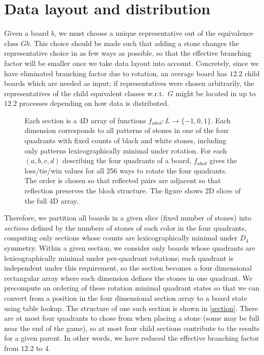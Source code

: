 \documentclass[conference]{IEEEtran}
\newcommand{\wrt}{w.\thinspace r.\thinspace t.\ }
\begin{document}
\section{Data layout and distribution}

Given a board $b$, we must choose a unique representative out of the equivalence class $Gb$.  This choice
should be made such that adding a stone changes the representative choice in as few ways as possible, so
that the effective branching factor will be smaller once we take data layout into account.
Concretely, since we have eliminated
branching factor due to rotation, an average board has $12.2$ child boards which are needed as input; if
representatives were chosen arbitrarily, the representatives of the child equivalent classes \wrt $G$
might be located in up to $12.2$ processes depending on how data is distributed.

\begin{figure}
\begin{center}

\end{center}
\vspace{-.15in}
\caption{Each section is a 4D array of functions $f_{abcd} : L \to \{-1,0,1\}$.  Each dimension
corresponds to all patterns of stones in one of the four quadrants with fixed counts of black and white
stones, including only patterns lexicographically minimal under rotation.  For each $(a,b,c,d)$
describing the four quadrants of a board, $f_{abcd}$ gives the loss/tie/win values for all 256 ways to rotate the
four quadrants.  The order is chosen so that reflected pairs are adjacent so that
reflection preserves the block structure.  The figure shows 2D slices of the full 4D array.}
\label{section}
\vspace{-.1in}
\end{figure}

Therefore, we partition all boards in a given slice (fixed number of stones) into \emph{sections} defined by the
numbers of stones of each color in the four quadrants, computing only sections whose counts are lexicographically
minimal under $D_4$ symmetry.  Within a given section, we consider only boards whose quadrants are lexicographically
minimal under per-quadrant rotations; each quadrant is independent under this requirement, so the section becomes
a four dimensional rectangular array where each dimension defines the stones in one quadrant.  We precompute an
ordering of these rotation minimal quadrant states so that we can convert from a position in the four dimensional
section array to a board state using table lookup.  The structure of one such section is shown in \autoref{section}.
There are at most four quadrants to chose from when placing a stone (some may be full near the end of the game),
so at most four child sections contribute to the results for a given parent.  In other words, we have reduced the
effective branching factor from $12.2$ to $4$.
\end{document}
